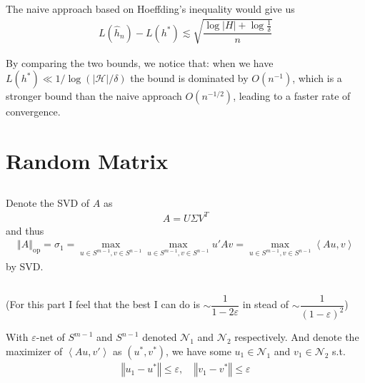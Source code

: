 \documentclass[11pt,a4paper]{ctexart}
\numberwithin{equation}{section}%
\begin{document}
\subsection{}

The naive approach based on Hoeffding's inequality would give us
\begin{align*}
     L(\hat{h}_n) - L(h^* )\lesssim  \sqrt{\dfrac{ \log \left\vert H \right\vert + \log \frac{1}{\delta }  }{ n } }
\end{align*}

By comparing the two bounds, we notice that: when we have $ L(h^*)\ll 1/\log (\left\vert \mathcal{H} \right\vert / \delta  ) $ the bound is dominated by $ O(n^{-1}) $, which is a stronger bound than the naive approach $ O(n^{-1/2}) $, leading to a faster rate of convergence.

\section{Random Matrix}

\subsection{}
Denote the SVD of $ A $ as
\begin{align*}
    A= U\Sigma V^T 
\end{align*}
and thus
\begin{align*}
    \left\Vert A \right\Vert _\mathrm{ op} = \sigma _1 = \mathop{ \max }\limits_{u\in S^{m-1},v\in S^{n-1}}\mathop{ \max }\limits_{u\in S^{m-1},v\in S^{n-1}} u'Av = \mathop{ \max }\limits_{u\in S^{m-1},v\in S^{n-1}}\left\langle Au, v \right\rangle 
\end{align*}
by SVD.


\subsection{}

(For this part I feel that the best I can do is $ \sim \dfrac{ 1 }{ 1-2\varepsilon  }  $ in stead of $ \sim \dfrac{ 1 }{ (1-\varepsilon )^2 }  $)


With $ \varepsilon  $-net of $ S^{m-1} $ and $ S^{n-1} $ denoted $ \mathcal{N}_1 $ and $ \mathcal{N}_2 $ respectively. And denote the maximizer of $ \left\langle Au, v' \right\rangle  $ as $ (u^*,v^*) $, we have some $ u_1\in \mathcal{N}_1 $ and $ v_1\in \mathcal{N}_2 $ s.t.
\begin{align*}
    \left\Vert u_1-u^* \right\Vert \leq \varepsilon ,\quad \left\Vert v_1-v^* \right\Vert \leq \varepsilon
\end{align*}
\end{document}
